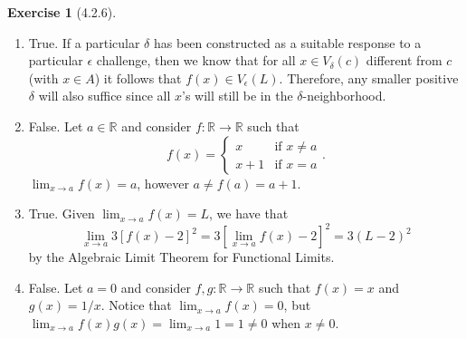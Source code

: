 \documentclass{amsart}
\theoremstyle{definition}
\newtheorem{exercise}{Exercise}
\newcommand{\R}{\mathbb{R}}
\begin{document}
\begin{exercise}[4.2.6]
  \begin{enumerate}[label={(\alph*)}]
    \item True. If a particular $\delta$ has been constructed as a suitable
      response to a particular $\epsilon$ challenge, then we know that for all
      $x \in V_\delta(c)$ different from $c$ (with $x \in A$) it follows that
      $f(x) \in V_\epsilon(L)$. Therefore, any smaller positive $\delta$ will
      also suffice since all $x$'s will still be in the $\delta$-neighborhood.
    \item False. Let $a \in \R$ and consider $f : \R \to \R$ such that
      \[
        f(x) =
        \begin{cases}
          x & \text{if $x \neq a$} \\
          x + 1 & \text{if $x = a$}
        \end{cases}.
      \]
      $\lim_{x \to a} f(x) = a$, however $a \neq f(a) = a + 1$.
    \item True. Given $\lim_{x \to a} f(x) = L$, we have that
      \[
        \lim_{x \to a} 3{[f(x) - 2]}^2 = 3{[\lim_{x \to a} f(x) - 2]}^2 = 3{(L -
        2)}^2
      \]
      by the Algebraic Limit Theorem for Functional Limits.
    \item False. Let $a = 0$ and consider $f, g : \R \to \R$ such that $f(x) =
      x$ and $g(x) = 1/x$. Notice that $\lim_{x \to a} f(x) = 0$, but $\lim_{x
      \to a} f(x) g(x) = \lim_{x \to a} 1 = 1 \neq 0$ when $x \neq 0$.
  \end{enumerate}
\end{exercise}
\end{document}
